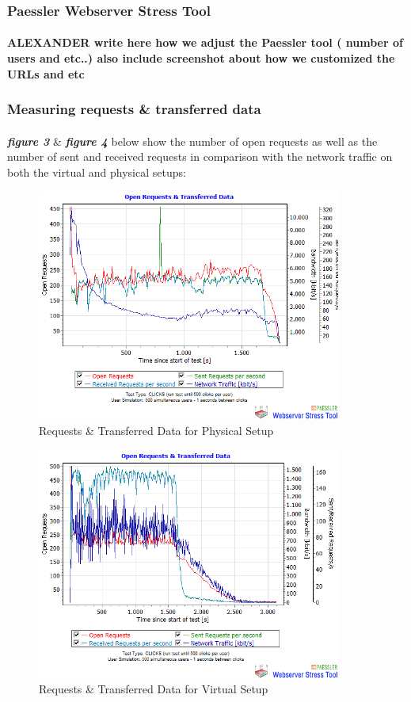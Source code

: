 \subsubsection{Paessler Webserver Stress Tool}
\paragraph{}

\textbf{ALEXANDER write here how we adjust the Paessler tool ( number of users and etc..) also include screenshot about how we customized the URLs and etc}

\subsubsection{Measuring requests \& transferred data}
\paragraph{}

\textbf{\textit{figure 3}} \& \textbf{\textit{figure 4}} below show the number of open requests as well as the number of sent and received requests in comparison with the network traffic on both the virtual and physical setups:
 

 \begin{figure}[H]
    \centering
    \includegraphics[width=10cm]{Pictures/graph6hw.png}
    \caption{Requests \& Transferred Data for Physical Setup}
    \label{fig:QQ3}
\end{figure}
   
 
\begin{figure}[H]
    \centering
    \includegraphics[width=10cm]{Pictures/graph6vm.png}
    \caption{Requests \& Transferred Data for Virtual Setup}
    \label{fig:QQ3}
\end{figure} 


